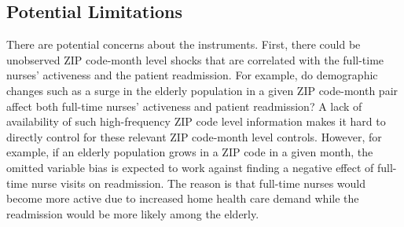 \documentclass[final,12pt]{article}
\begin{document}



\subsection{Potential Limitations} \label{sec:ch1_limit}

There are potential concerns about the instruments.
First, there could be unobserved ZIP code-month level shocks that are correlated with  the full-time nurses' activeness and the patient readmission. For example, do demographic changes such as a surge in the elderly population in a given ZIP code-month pair affect both full-time nurses' activeness and patient readmission?
A lack of availability of such high-frequency ZIP code level information makes it hard to directly control for these relevant ZIP code-month level controls.
However, for example, if an elderly population grows in a ZIP code in a given month, the omitted variable bias is expected to work against finding a negative effect of full-time nurse visits on readmission.
The reason is that full-time nurses would become more active due to increased home health care demand while the readmission would be more likely among the elderly.
\end{document}
